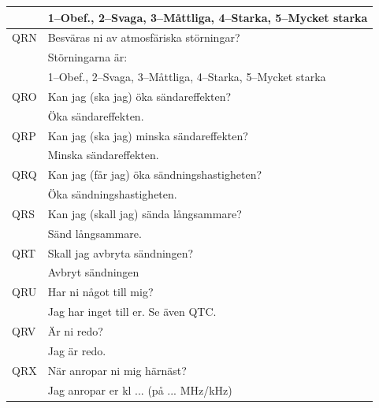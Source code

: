 \begin{longtable}{ll}
                     & 1--Obef., 2--Svaga, 3--Måttliga, 4--Starka, 5--Mycket starka         \\ \hline
	QRN          & Besväras ni av atmosfäriska störningar?                              \\
                     & Störningarna är:                                                     \\
                     & 1--Obef., 2--Svaga, 3--Måttliga, 4--Starka, 5--Mycket starka         \\ \hline
	QRO          & Kan jag (ska jag) öka sändareffekten?                                \\
                     & Öka sändareffekten.                                                  \\ \hline
	QRP          & Kan jag (ska jag) minska sändareffekten?                             \\
                     & Minska sändareffekten.                                               \\ \hline
	QRQ          & Kan jag (får jag) öka sändningshastigheten?                          \\
                     & Öka sändningshastigheten.                                            \\ \hline
	QRS          & Kan jag (skall jag) sända långsammare?                               \\
                     & Sänd långsammare.                                                    \\ \hline
	QRT          & Skall jag avbryta sändningen?                                        \\
                     & Avbryt sändningen                                                    \\ \hline
	QRU          & Har ni något till mig?                                               \\
                     & Jag har inget till er. Se även QTC.                                  \\ \hline
	QRV          & Är ni redo?                                                          \\
                     & Jag är redo.                                                         \\ \hline
	QRX          & När anropar ni mig härnäst?                                          \\
                     & Jag anropar er kl ... (på ... MHz/kHz)                               \\ \hline

\end{longtable}
